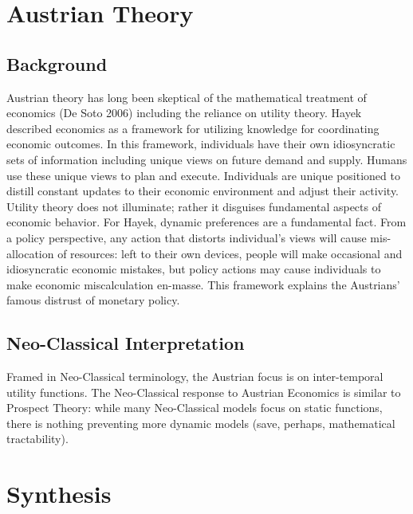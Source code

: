 \documentclass{article}
\theoremstyle{definition}
\begin{document}
\section{Austrian Theory}

\subsection{Background}
Austrian theory has long been skeptical of the mathematical treatment of economics (De Soto 2006) including the reliance on utility theory.  Hayek described economics as a framework for utilizing knowledge for coordinating economic outcomes.  In this framework, individuals have their own idiosyncratic sets of information including unique views on future demand and supply.  Humans use these unique views to plan and execute.  Individuals are unique positioned to distill constant updates to their economic environment and adjust their activity.  Utility theory does not illuminate; rather it disguises fundamental aspects of economic behavior.  For Hayek, dynamic preferences are a fundamental fact.  From a policy perspective, any action that distorts individual's views will cause mis-allocation of resources: left to their own devices, people will make occasional and idiosyncratic economic mistakes, but policy actions may cause individuals to make economic miscalculation en-masse.  This framework explains the Austrians' famous distrust of monetary policy.  

\subsection{Neo-Classical Interpretation}

Framed in Neo-Classical terminology, the Austrian focus is on inter-temporal utility functions.  The Neo-Classical response to Austrian Economics is similar to Prospect Theory: while many Neo-Classical models focus on static functions, there is nothing preventing more dynamic models (save, perhaps, mathematical tractability).  


\section{Synthesis} \label{research}
\end{document}
